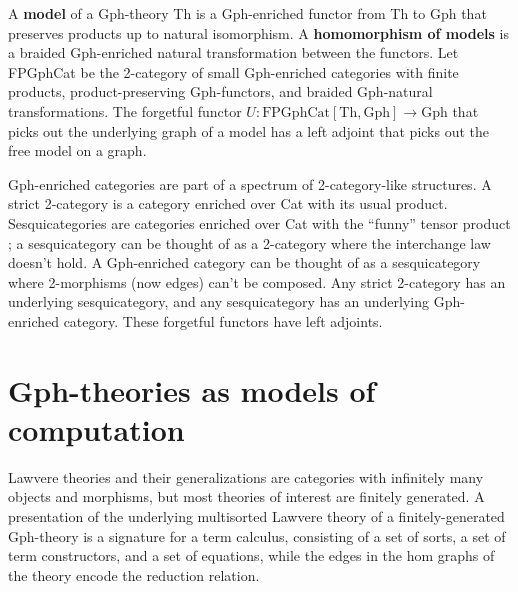 \documentclass[a4paper,UKenglish]{lipics-v2016}
\newcommand{\maps}{\colon}
\newcommand{\Th}{\mathrm{Th}}
\newcommand{\Gph}{\mathrm{Gph}}
\newcommand{\FPGphCat}{\mathrm{FPGphCat}}
\begin{document}
A {\bf model} of a Gph-theory Th is a Gph-enriched functor from Th to Gph that preserves products up to natural isomorphism.  A {\bf homomorphism of models} is a braided Gph-enriched natural transformation between the functors.  Let FPGphCat be the 2-category of small Gph-enriched categories with finite products, product-preserving Gph-functors, and braided Gph-natural transformations.  The forgetful functor $U\maps \FPGphCat[\Th, \Gph] \to \Gph$ that picks out the underlying graph of a model has a left adjoint that picks out the free model on a graph.

Gph-enriched categories are part of a spectrum of 2-category-like structures.  A strict 2-category is a category enriched over Cat with its usual product.  Sesquicategories are categories enriched over Cat with the ``funny'' tensor product \cite{Lack2CategoriesCompanion}; a sesquicategory can be thought of as a 2-category where the interchange law doesn't hold.  A Gph-enriched category can be thought of as a sesquicategory where 2-morphisms (now edges) can't be composed.  Any strict 2-category has an underlying sesquicategory, and any sesquicategory has an underlying Gph-enriched category.  These forgetful functors have left adjoints.

\section{Gph-theories as models of computation}

Lawvere theories and their generalizations are categories with infinitely many objects and morphisms, but most theories of interest are finitely generated.  A presentation of the underlying multisorted Lawvere theory of a finitely-generated Gph-theory is a signature for a term calculus, consisting of a set of sorts, a set of term constructors, and a set of equations, while the edges in the hom graphs of the theory encode the reduction relation.
\end{document}
